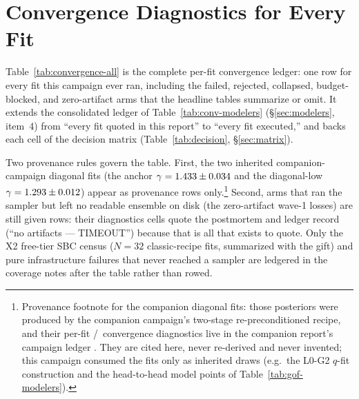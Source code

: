 
\appendix

\section{Convergence Diagnostics for Every Fit}
\label{app:convergence}

Table~\ref{tab:convergence-all} is the complete per-fit convergence ledger:
one row for every fit this campaign ever ran, including the failed,
rejected, collapsed, budget-blocked, and zero-artifact arms that the
headline tables summarize or omit. It extends the consolidated ledger of
Table~\ref{tab:conv-modelers} (\S\ref{sec:modelers}, item~4) from ``every
fit quoted in this report'' to ``every fit executed,'' and backs each cell
of the decision matrix (Table~\ref{tab:decision}, \S\ref{sec:matrix}).

Two provenance rules govern the table. First, the two inherited
companion-campaign diagonal fits (the anchor $\gamma=1.433\pm0.034$ and
the diagonal-low $\gamma=1.293\pm0.012$) appear as provenance rows
only.\footnote{Provenance footnote for the companion diagonal fits: those
posteriors were produced by the companion campaign's two-stage
re-preconditioned recipe, and their per-fit \Rhat/\ESS\ convergence
diagnostics live in the companion report's campaign ledger
\citep{cgl2026companion}. They are cited here, never re-derived and never
invented; this campaign consumed the fits only as inherited draws (e.g.\
the L0-G2 $q$-fit construction and the head-to-head model points of
Table~\ref{tab:gof-modelers}).} Second, arms that ran the sampler but left
no readable ensemble on disk (the zero-artifact wave-1 losses) are still
given rows: their diagnostics cells quote the postmortem and ledger record
(``no artifacts --- TIMEOUT'') because that is all that exists to quote.
Only the X2 free-tier SBC census ($N{=}32$ classic-recipe fits, summarized
with the gift) and pure infrastructure failures that never reached a
sampler are ledgered in the coverage notes after the table rather than
rowed.


